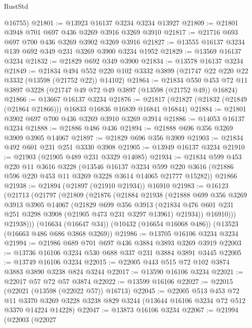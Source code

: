 \begin{lexlean}{RustStd}
\begin{coremodule}
      @16755)
@21801 := @13923 @16137 @3234 @3234 @13927
@21809 := @21801 @3948 @701 @697 @436 @3269 @3916 @3269 @3910
@21817 := @21716 @693 @697 @700 @436 @3269 @3902 @3269 @3916
@21827 := @13555 @16137 @3234 @139 @692 @349 @231 @3269 @3900 @3234 @1952
@21829 := @13569 @16137 @3234
@21832 := @21829 @692 @349 @3900
@21834 := @13578 @16137 @3234
@21849 := @21834
    @494
    @552
    @220
    @102
    @3332
    @3899
    (@21747 @22 @220 @22 @3332 (@13598 (@21752 @22)) @14102)
@21864 := @21834
    @550
    @453
    @72
    @11
    @3897
    @3228
    (@21747 @49 @72 @49 @3897 (@13598 (@21752 @49)) @16824)
@21866 := @13667 @16137 @3234
@21876 := @21817 (@21827 (@21832 (@21849 (@21864 @21866))) @16833 @16836 @16839 @16841 @16844)
@21884 := @21801 @3902 @697 @700 @436 @3269 @3910 @3269 @3914
@21886 := @14053 @16137 @3234
@21888 := @21886 @486 @436
@21894 := @21888 @696 @356 @3269 @3909 @3905 @14067
@21897 := @21829 @696 @356 @3909
@21903 := @21834 @492 @601 @231 @251 @3330 @3908
@21905 := @13949 @16137 @3234
@21910 := @21903 (@21905 @489 @231 @3329 @14085)
@21934 := @21834
    @599
    @453
    @220
    @11
    @3616
    @3228
    (@13546
      @16137
      @3234
      @599
      @220
      @3616
      (@21886 @596 @220 @453 @11 @3269 @3228 @3614 @14065 @21777 @15282))
    @21866
@21938 := @21894 (@21897 (@21910 @21934)) @16910
@21983 := @16123
    (@21713
      (@21797
        (@21809
          (@21876
            (@21884
              @21938
              (@21888
                @699
                @356
                @3269
                @3913
                @3905
                @14067
                (@21829
                  @699
                  @356
                  @3913
                  (@21834 @476 @601 @231 @251 @3298 @3908 (@21905 @473 @231 @3297 @13961) @21934))
                @16910)))
          @21938)))
    (@16634 (@16647 @34))
    (@10432 (@16654 @16068 @486))
    (@13523 (@16663 @486 @686 @3868 @3269))
@21986 := @13705 @16106 @3234 @3234
@21994 := @21986 @689 @701 @697 @436 @3884 @3893 @3269 @3919
@22003 := @13736 @16106 @3234 @530 @688 @337 @231 @3884 @3891 @3445
@22005 := @13749 @16106 @3234
@22015 := @22005 @443 @515 @72 @102 @3874 @3883 @3890 @3238 @824 @3244
@22017 := @13590 @16106 @3234
@22021 := @22017 @57 @72 @57 @3874
@22022 := @13599 @16106
@22027 := @22015 (@22021 (@13598 (@22022 @57)) @16713)
@22045 := @22005
    @513
    @453
    @72
    @11
    @3370
    @3269
    @3228
    @3238
    @829
    @3244
    (@13644 @16106 @3234 @72 @512 @3370 @14224 @14228)
@22047 := @13873 @16106 @3234
@22067 := @21994
    (@22003
      (@22027

\end{coremodule}
\end{lexlean}
